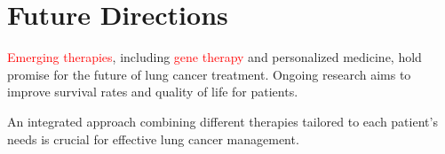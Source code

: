 \section{Future Directions}
\begin{remark}
\textcolor{red}{Emerging therapies}, including \textcolor{red}{gene therapy} and personalized medicine, hold promise for the future of lung cancer treatment. Ongoing research aims to improve survival rates and quality of life for patients.
\end{remark}

An integrated approach combining different therapies tailored to each patient's needs is crucial for effective lung cancer management.